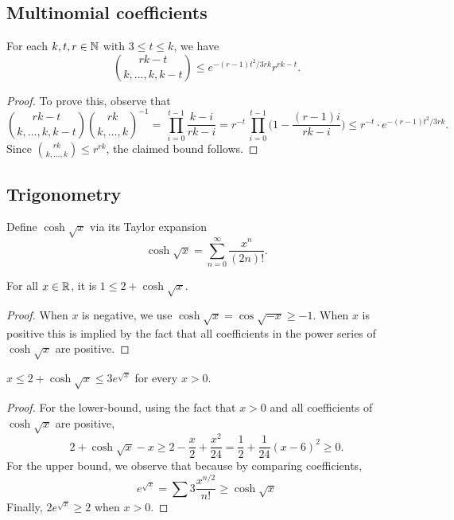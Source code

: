 \subsection{Multinomial coefficients}

\begin{lemma}  
  \label{lem:multibounds}
  For each $k,t,r \in \mathbb{N}$ with $3 \le t \le k$, we have
  $$\binom{rk-t}{k,\dots,k,k-t} \le e^{-(r-1)t^2/3rk} r^{rk-t}.$$
\end{lemma}
  
\begin{proof}
  To prove this, observe that 
  $$\binom{rk-t}{k,\dots,k,k-t} \binom{rk}{k,\dots,k}^{-1} = \, \prod_{i = 0}^{t - 1} \frac{k - i}{rk - i} = r^{-t} \,\prod_{i = 0}^{t-1} \bigg( 1 - \frac{(r-1)i}{rk - i} \bigg) \le r^{-t} \cdot e^{-(r-1)t^2/3rk}.$$
  Since $\binom{rk}{k,\dots,k} \le r^{rk}$, the claimed bound follows.
\end{proof}


\subsection{Trigonometry}

\begin{definition}
  \label{def:coshsqrt}
  \leanok
  Define $\cosh \sqrt{x}$ via its Taylor expansion
  $$\cosh\sqrt{x} = \sum_{n = 0}^\infty \frac{x^n}{(2n)!}.$$
\end{definition}

\begin{lemma}
  \label{lem:le-coshsqrt}
  For all $x \in \mathbb{R}$, it is $1 \le 2 + \cosh\sqrt{x}$.
\end{lemma}
\begin{proof}
  When $x$ is negative, we use $\cosh \sqrt{x} = \cos \sqrt{-x}\ge -1$. When $x$ is positive this is implied by the fact that all coefficients in the power series of $\cosh \sqrt{x}$ are positive.
\end{proof}

\begin{lemma}
  \label{lem:coshsqrt-bd-pos}
  $x \le 2 + \cosh \sqrt{x} \le 3 e^{\sqrt{x}}$ for every $x > 0$.
\end{lemma}
\begin{proof}
  For the lower-bound, using the fact that $x>0$ and all coefficients of $\cosh \sqrt{x}$ are positive,
  \begin{equation*}
    2+\cosh \sqrt{x} - x \ge 2 - \frac{x}{2} + \frac{x^2}{24} = \frac{1}{2}+\frac{1}{24}(x-6)^2 \ge 0.
\end{equation*}
For the upper bound, we observe that because by comparing coefficients,
\begin{equation*}
  e^{\sqrt{x}} = \sum 3\frac{x^{n/2}}{n!}  \ge \cosh\sqrt{x}
\end{equation*}
Finally, $2e^{\sqrt{x}}\ge 2$ when $x>0$.
\end{proof}

